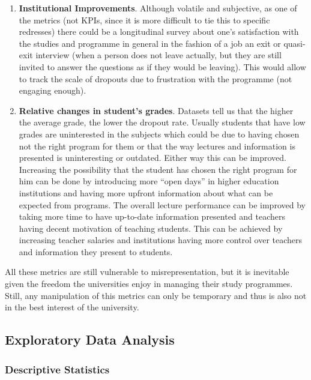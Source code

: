 \documentclass[
  letterpaper,
  DIV=11,
  numbers=noendperiod]{scrartcl}
\begin{document}
\begin{enumerate}
\def\labelenumi{\alph{enumi}.}
\item
  \textbf{Institutional Improvements}. Although volatile and subjective,
  as one of the metrics (not KPIs, since it is more difficult to tie
  this to specific redresses) there could be a longitudinal survey about
  one's satisfaction with the studies and programme in general in the
  fashion of a job an exit or quasi-exit interview (when a person does
  not leave actually, but they are still invited to answer the questions
  as if they would be leaving). This would allow to track the scale of
  dropouts due to frustration with the programme (not engaging enough).
\item
  \textbf{Relative changes in student's grades}. Datasets tell us that
  the higher the average grade, the lower the dropout rate. Usually
  students that have low grades are uninterested in the subjects which
  could be due to having chosen not the right program for them or that
  the way lectures and information is presented is uninteresting or
  outdated. Either way this can be improved. Increasing the possibility
  that the student has chosen the right program for him can be done by
  introducing more \enquote{open days} in higher education institutions
  and having more upfront information about what can be expected from
  programs. The overall lecture performance can be improved by taking
  more time to have up-to-date information presented and teachers having
  decent motivation of teaching students. This can be achieved by
  increasing teacher salaries and institutions having more control over
  teachers and information they present to students.
\end{enumerate}

All these metrics are still vulnerable to misrepresentation, but it is
inevitable given the freedom the universities enjoy in managing their
study programmes. Still, any manipulation of this metrics can only be
temporary and thus is also not in the best interest of the university.

\hypertarget{exploratory-data-analysis}{%
\subsection{Exploratory Data Analysis}\label{exploratory-data-analysis}}

\hypertarget{descriptive-statistics}{%
\subsubsection{Descriptive Statistics}\label{descriptive-statistics}}
\end{document}
